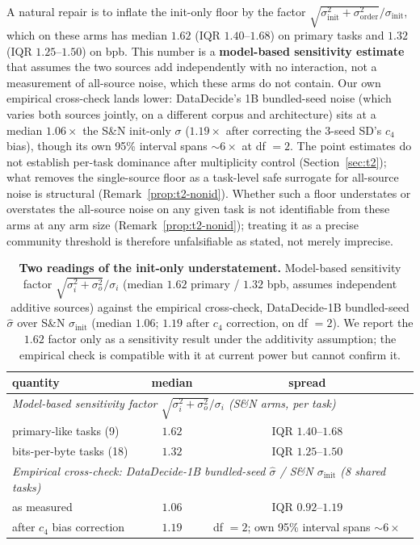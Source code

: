 A natural repair is to inflate the init-only floor by the factor
$\sqrt{\sigma_{\mathrm{init}}^2 + \sigma_{\mathrm{order}}^2}/\sigma_{\mathrm{init}}$, which on
these arms has median $1.62$ (IQR $1.40$--$1.68$) on primary tasks and $1.32$ (IQR
$1.25$--$1.50$) on bpb. This number is a \textbf{model-based sensitivity
estimate} that assumes the two sources add independently with no interaction, not a measurement
of all-source noise, which these arms do not contain. Our own empirical cross-check lands lower:
DataDecide's 1B bundled-seed noise (which varies both sources jointly, on a different corpus and
architecture) sits at a median $1.06\times$ the S\&N init-only $\sigma$ ($1.19\times$ after
correcting the 3-seed SD's $c_4$ bias), though its own 95\% interval spans ${\sim}6\times$ at
df $= 2$. The point estimates do not establish per-task dominance after multiplicity control
(Section~\ref{sec:t2}); what removes the single-source floor as a task-level safe
surrogate for all-source noise is structural (Remark~\ref{prop:t2-nonid}). Whether such a floor understates or overstates the all-source noise on any
given task is not identifiable from these arms at any arm size
(Remark~\ref{prop:t2-nonid}); treating it as a precise community threshold is therefore
unfalsifiable as stated, not merely imprecise.

\begin{table}[!htbp]
\centering
\caption{\textbf{Two readings of the init-only understatement.} Model-based sensitivity factor
$\sqrt{\sigma_i^2+\sigma_o^2}/\sigma_i$ (median $1.62$ primary / $1.32$ bpb, assumes independent
additive sources) against the empirical cross-check, DataDecide-1B bundled-seed $\hat\sigma$
over S\&N $\sigma_{\mathrm{init}}$ (median $1.06$; $1.19$ after $c_4$ correction, on df $= 2$).
We report the $1.62$ factor only as a sensitivity result under the additivity assumption; the
empirical check is compatible with it at current power but cannot confirm it.}
\label{tab:t2bundle}
\footnotesize
\begin{tabular}{@{}lcc@{}}
\toprule
quantity & median & spread \\
\midrule
\multicolumn{3}{l}{\emph{Model-based sensitivity factor $\sqrt{\sigma_i^2+\sigma_o^2}/\sigma_i$
(S\&N arms, per task)}}\\
\quad primary-like tasks (9) & $1.62$ & IQR $1.40$--$1.68$ \\
\quad bits-per-byte tasks (18) & $1.32$ & IQR $1.25$--$1.50$ \\
\midrule
\multicolumn{3}{l}{\emph{Empirical cross-check: DataDecide-1B bundled-seed $\hat\sigma$ /
S\&N $\sigma_{\mathrm{init}}$ (8 shared tasks)}}\\
\quad as measured & $1.06$ & IQR $0.92$--$1.19$ \\
\quad after $c_4$ bias correction & $1.19$ & df $= 2$; own 95\% interval spans ${\sim}6\times$ \\
\bottomrule
\end{tabular}
\end{table}

